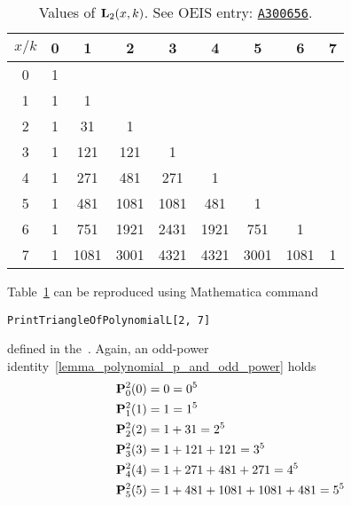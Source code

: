 \begin{table}[H]
    \begin{tabular}{c|cccccccc}
        $x/k$ & 0 & 1    & 2    & 3    & 4    & 5    & 6    & 7 \\ [3px]
        \hline
        0     & 1 &      &      &      &      &      &      &   \\
        1     & 1 & 1    &      &      &      &      &      &   \\
        2     & 1 & 31   & 1    &      &      &      &      &   \\
        3     & 1 & 121  & 121  & 1    &      &      &      &   \\
        4     & 1 & 271  & 481  & 271  & 1    &      &      &   \\
        5     & 1 & 481  & 1081 & 1081 & 481  & 1    &      &   \\
        6     & 1 & 751  & 1921 & 2431 & 1921 & 751  & 1    &   \\
        7     & 1 & 1081 & 3001 & 4321 & 4321 & 3001 & 1081 & 1
    \end{tabular}
    \caption{Values of ${\mathbf{L}}\sb{2}(x,k)$. See OEIS entry: \href{https://oeis.org/A300656}{\texttt{A300656}}.}
    \label{tab:tab_4}
\end{table}
Table~\ref{tab:tab_4} can be reproduced using Mathematica command
\begin{center}
    \texttt{PrintTriangleOfPolynomialL[2, 7]}
\end{center}
defined in the~\cite{github_source_files}.
Again, an odd-power identity~\ref{lemma_polynomial_p_and_odd_power} holds
\begin{equation*}
    \begin{split}
        {\mathbf{P}}\sp{2} \sb{0}(0) &= 0 = 0^5 \\
        {\mathbf{P}}\sp{2} \sb{1}(1) &= 1 = 1^5 \\
        {\mathbf{P}}\sp{2} \sb{2}(2) &= 1+31 = 2^5 \\
        {\mathbf{P}}\sp{2} \sb{3}(3) &= 1+121+121 = 3^5 \\
        {\mathbf{P}}\sp{2} \sb{4}(4) &= 1+271+481+271 = 4^5 \\
        {\mathbf{P}}\sp{2} \sb{5}(5) &= 1+481+1081+1081+481 = 5^5
    \end{split}
\end{equation*}
